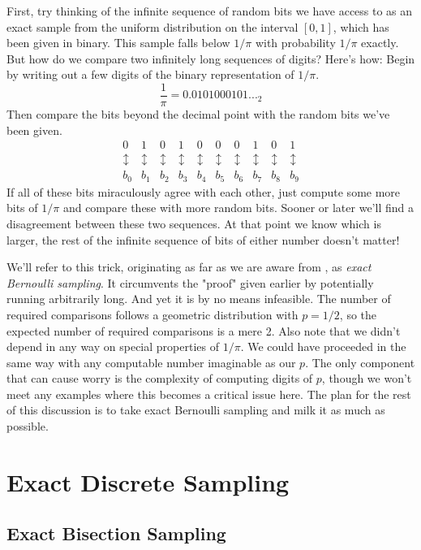 \documentclass{article}
\begin{document}
First, try thinking of the infinite sequence of random bits we have access to as an exact sample from the uniform distribution on the interval $[0,1]$, which has been given in binary. This sample falls below $1/\pi$ with probability $1/\pi$ exactly. But how do we compare two infinitely long sequences of digits? Here's how: Begin by writing out a few digits of the binary representation of $1/\pi$.
$$\frac{1}{\pi} = 0.0101000101..._2$$
Then compare the bits beyond the decimal point with the random bits we've been given.
\[
\begin{matrix}
0 & 1 & 0 & 1 & 0 & 0 & 0 & 1 & 0 & 1\\
\updownarrow & \updownarrow & \updownarrow & \updownarrow & \updownarrow & \updownarrow & \updownarrow & \updownarrow & \updownarrow & \updownarrow \\
b_0 & b_1 & b_2 & b_3 & b_4 & b_5 & b_6 & b_7 & b_8 & b_9
\end{matrix}
\]
If all of these bits miraculously agree with each other, just compute some more bits of $1/\pi$ and compare these with more random bits. Sooner or later we'll find a disagreement between these two sequences. At that point we know which is larger, the rest of the infinite sequence of bits of either number doesn't matter!

We'll refer to this trick, originating as far as we are aware from \cite{Knuth-Yao}, as \textit{exact Bernoulli sampling}. It circumvents the "proof" given earlier by potentially running arbitrarily long. And yet it is by no means infeasible. The number of required comparisons follows a geometric distribution with $p=1/2$, so the expected number of required comparisons is a mere 2. Also note that we didn't depend in any way on special properties of $1/\pi$. We could have proceeded in the same way with any computable number imaginable as our $p$. The only component that can cause worry is the complexity of computing digits of $p$, though we won't meet any examples where this becomes a critical issue here. The plan for the rest of this discussion is to take exact Bernoulli sampling and milk it as much as possible.

\section{Exact Discrete Sampling}

\subsection{Exact Bisection Sampling}
\end{document}
